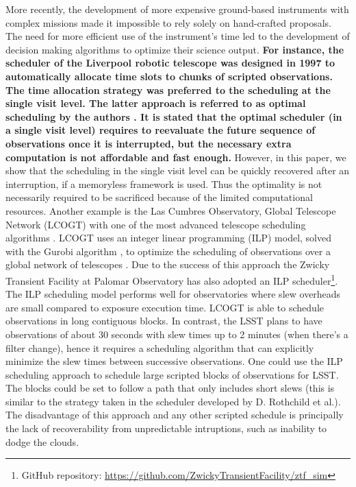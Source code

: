 \documentclass[12pt]{aastex62}
\theoremstyle{definition}
\begin{document}
More recently, the development of more expensive ground-based instruments with complex missions made it impossible to rely solely on hand-crafted proposals. The need for more efficient use of the instrument's time led to the development of decision making algorithms to optimize their science output. {\bf For instance, the scheduler of the Liverpool robotic telescope was designed in 1997 to automatically allocate time slots to chunks of scripted observations. The time allocation strategy was preferred to the scheduling at the single visit level. The latter approach is referred to as optimal scheduling by the authors \citep{steele1997control}. It is stated that the optimal scheduler (in a single visit level) requires to reevaluate the future sequence of observations once it is interrupted, but the necessary extra computation is not affordable and fast enough.\bf} However, in this paper, we show that the scheduling in the single visit level can be quickly recovered after an interruption, if a memoryless framework is used. Thus the optimality is not necessarily required to be sacrificed because of the limited computational resources. Another example is the Las Cumbres Observatory, Global Telescope Network (LCOGT) with one of the most advanced telescope scheduling algorithms \citep{Boroson14, Saunders14}. LCOGT uses an integer linear programming (ILP) model, solved with the Gurobi algorithm \citep{gurobi}, to optimize the scheduling of observations over a global network of telescopes \citep{Lampoudi15}. Due to the success of this approach the Zwicky Transient Facility at Palomar Observatory \citep{Bellm14} has also adopted an ILP scheduler\footnote{GitHub repository: \url{https://github.com/ZwickyTransientFacility/ztf_sim}}. The ILP scheduling model performs well for observatories where slew overheads are small compared to exposure execution time. LCOGT is able to schedule observations in long contiguous blocks. In contrast, the LSST plans to have observations of about 30 seconds with slew times up to 2 minutes (when there's a filter change), hence it requires a scheduling algorithm that can explicitly minimize the slew times between successive observations. One could use the ILP scheduling approach to schedule large scripted blocks of observations for LSST. The blocks could be set to follow a path that only includes short slews (this is similar to the strategy taken in the scheduler developed by D. Rothchild et al.). The disadvantage of this approach and any other scripted schedule is principally the lack of recoverability from unpredictable intruptions, such as inability to dodge the clouds.
\end{document}
